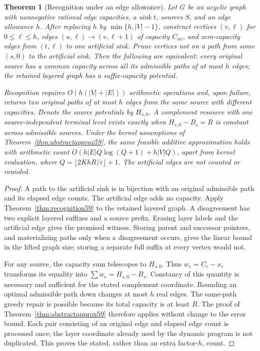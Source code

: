 \documentclass[11pt,letterpaper]{article}
\newtheorem{theorem}{Theorem}[section]
\theoremstyle{definition}\newtheorem{remark}[theorem]{Remark}
\begin{document}
\begin{theorem}[Recognition under an edge allowance]\label{thm:bounded60}
Let $G$ be an acyclic graph with nonnegative rational edge capacities, a sink $t$, sources $S$, and an edge allowance $h$. After replacing $h$ by $\min\{h,|V|-1\}$, construct vertices $(v,\ell)$ for $0\leq\ell\leq h$, edges $(u,\ell)\to(v,\ell+1)$ of capacity $C_{uv}$, and zero-capacity edges from $(t,\ell)$ to one artificial sink. Prune vertices not on a path from some $(s,0)$ to the artificial sink. Then the following are equivalent: every original source has a common capacity across all its admissible paths of at most $h$ edges; the retained layered graph has a suffix-capacity potential.

Recognition requires $O(h(|V|+|E|))$ arithmetic operations and, upon failure, returns two original paths of at most $h$ edges from the same source with different capacities. Denote the source potentials by $H_{s,0}$. A complement resource with one source-independent terminal level exists exactly when $H_{s,0}-B_s=R$ is constant across admissible sources. Under the kernel assumptions of Theorem~\ref{thm:abstractapprox59}, the same feasible additive approximation holds with arithmetic count
$O(h|E|Q\log(Q+1)+h|V|Q)$, apart from kernel evaluation, where $Q=\lfloor2KhR/\varepsilon\rfloor+1$. The artificial edges are not counted or rounded.
\end{theorem}
\begin{proof}
A path to the artificial sink is in bijection with an original admissible path and its elapsed edge counts. The artificial edge adds no capacity. Apply Theorem~\ref{thm:recognition59} to the retained layered graph. A disagreement has two explicit layered suffixes and a source prefix. Erasing layer labels and the artificial edge gives the promised witness. Storing parent and successor pointers, and materializing paths only when a disagreement occurs, gives the linear bound in the lifted graph size; storing a separate full suffix at every vertex would not.

For any source, the capacity sum telescopes to $H_{s,0}$. Thus $w_e=C_e-x_e$ transforms its equality into $\sum w_e=H_{s,0}-B_s$. Constancy of this quantity is necessary and sufficient for the stated complement coordinate. Rounding an optimal admissible path down changes at most $h$ real edges. The same-path greedy repair is possible because its total capacity is at least $R$. The proof of Theorem~\ref{thm:abstractapprox59} therefore applies without change to the error bound. Each pair consisting of an original edge and elapsed edge count is processed once; the layer coordinate already used by the dynamic program is not duplicated. This proves the stated, rather than an extra factor-$h$, count.
\end{proof}
\end{document}
